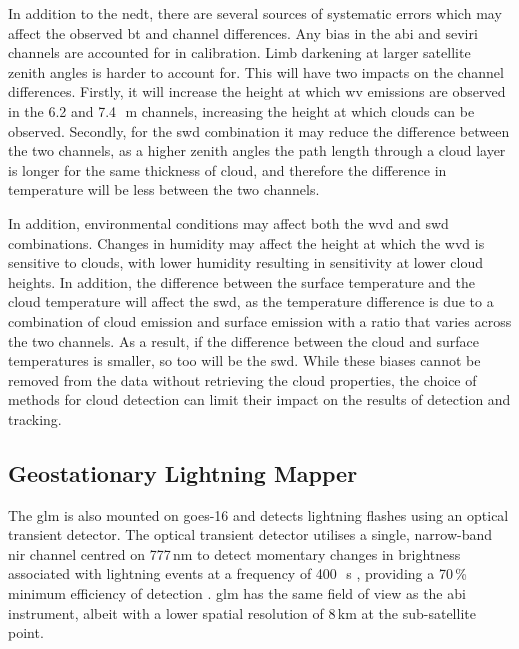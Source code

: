 In addition to the \acrshort{nedt}, there are several sources of systematic errors which may affect the observed \acrshort{bt} and channel differences.
Any bias in the \acrshort{abi} and \acrshort{seviri} channels are accounted for in calibration.
Limb darkening at larger satellite zenith angles is harder to account for.
This will have two impacts on the channel differences.
Firstly, it will increase the height at which \acrshort{wv} emissions are observed in the 6.2 and 7.4\,\unit{\mu m} channels, increasing the height at which clouds can be observed.
Secondly, for the \acrshort{swd} combination it may reduce the difference between the two channels, as a higher zenith angles the path length through a cloud layer is longer for the same thickness of cloud, and therefore the difference in temperature will be less between the two channels.

In addition, environmental conditions may affect both the \acrshort{wvd} and \acrshort{swd} combinations.
Changes in humidity may affect the height at which the \acrshort{wvd} is sensitive to clouds, with lower humidity resulting in sensitivity at lower cloud heights.
In addition, the difference between the surface temperature and the cloud temperature will affect the \acrshort{swd}, as the temperature difference is due to a combination of cloud emission and surface emission with a ratio that varies across the two channels.
As a result, if the difference between the cloud and surface temperatures is smaller, so too will be the \acrshort{swd}.
While these biases cannot be removed from the data without retrieving the cloud properties, the choice of methods for cloud detection can limit their impact on the results of detection and tracking.


\subsection{Geostationary Lightning Mapper}

The \acrshort{glm} is also mounted on \acrshort{goes}-16 and detects lightning flashes using an optical transient detector.
The optical transient detector utilises a single, narrow-band \acrshort{nir} channel centred on 777\,\unit{nm} \citep{orville_absolute_1984} to detect momentary changes in brightness associated with lightning events at a frequency of 400\,\unit{\mu s} \citep{christian_global_2003}, providing a 70\,\% minimum efficiency of detection \citep{goodman_goes-r_2013}.
\acrshort{glm} has the same field of view as the \acrshort{abi} instrument, albeit with a lower spatial resolution of 8\,\unit{km} at the sub-satellite point.

